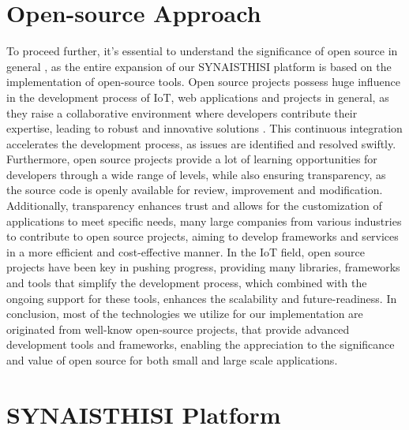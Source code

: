 \section{Open-source Approach}\label{open_source_approach}
To proceed further, it's essential to understand the significance of open source in general , as the entire expansion of our SYNAISTHISI platform is based on the implementation of open-source tools. Open source projects possess huge influence in the development process of IoT, web applications and projects in general, as they raise a collaborative environment where developers contribute their expertise, leading to robust and innovative solutions \cite{BenefitsofOpen-SourceSoftwareforDevelopers}. This continuous integration accelerates the development process, as issues are identified and resolved swiftly. Furthermore, open source projects provide a lot of learning opportunities for developers through a wide range of levels, while also ensuring transparency, as the source code is openly available for review, improvement and modification. Additionally, transparency enhances trust and allows for the customization of applications to meet specific needs, many large companies \cite{OpenSourceContributorIndex} from various industries to contribute to open source projects, aiming to develop frameworks and services in a more efficient and cost-effective manner. In the IoT field, open source projects have been key in pushing progress, providing many libraries, frameworks and tools \cite{IntelOpensource} that simplify the development process, which combined with the ongoing support for these tools, enhances the scalability and future-readiness. In conclusion, most of the technologies we utilize for our implementation are originated from well-know open-source projects, that provide advanced development tools and frameworks, enabling the appreciation to the significance and value of open source for both small and large scale applications.

\section{SYNAISTHISI Platform}

